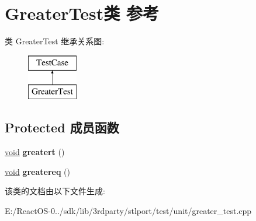 \hypertarget{class_greater_test}{}\section{Greater\+Test类 参考}
\label{class_greater_test}
类 Greater\+Test 继承关系图\+:\begin{figure}[H]
\begin{center}
\leavevmode
\includegraphics[height=2.000000cm]{class_greater_test}
\end{center}
\end{figure}
\subsection*{Protected 成员函数}
\begin{DoxyCompactItemize}
\item 
\mbox{\label{class_greater_test_a87b1620b4a9f44ad3828105ed6f929c8}} 
\hyperlink{interfacevoid}{void} {\bfseries greatert} ()
\item 
\mbox{\label{class_greater_test_acb14fe3298d03936e0812c2a8f6770a4}} 
\hyperlink{interfacevoid}{void} {\bfseries greatereq} ()
\end{DoxyCompactItemize}


该类的文档由以下文件生成\+:\begin{DoxyCompactItemize}
\item 
E\+:/\+React\+O\+S-\/0../sdk/lib/3rdparty/stlport/test/unit/greater\+\_\+test.\+cpp\end{DoxyCompactItemize}
